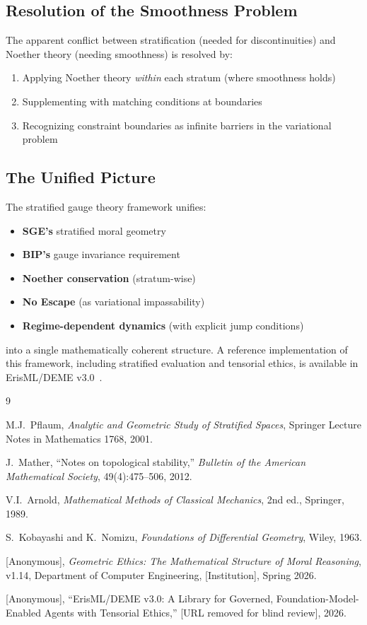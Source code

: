 \documentclass[11pt,a4paper]{article}
\begin{document}
\subsection{Resolution of the Smoothness Problem}

The apparent conflict between stratification (needed for discontinuities) and Noether theory (needing smoothness) is resolved by:
\begin{enumerate}
    \item Applying Noether theory \textit{within} each stratum (where smoothness holds)
    \item Supplementing with matching conditions at boundaries
    \item Recognizing constraint boundaries as infinite barriers in the variational problem
\end{enumerate}

\subsection{The Unified Picture}

The stratified gauge theory framework unifies:
\begin{itemize}
    \item \textbf{SGE's} stratified moral geometry
    \item \textbf{BIP's} gauge invariance requirement
    \item \textbf{Noether conservation} (stratum-wise)
    \item \textbf{No Escape} (as variational impassability)
    \item \textbf{Regime-dependent dynamics} (with explicit jump conditions)
\end{itemize}
into a single mathematically coherent structure. A reference implementation of this framework, including stratified evaluation and tensorial ethics, is available in ErisML/DEME v3.0~\cite{bond2026erisml}.

\begin{thebibliography}{9}

M.J.\ Pflaum, \textit{Analytic and Geometric Study of Stratified Spaces}, Springer Lecture Notes in Mathematics 1768, 2001.

J.\ Mather, ``Notes on topological stability,'' \textit{Bulletin of the American Mathematical Society}, 49(4):475--506, 2012.

V.I.\ Arnold, \textit{Mathematical Methods of Classical Mechanics}, 2nd ed., Springer, 1989.

S.\ Kobayashi and K.\ Nomizu, \textit{Foundations of Differential Geometry}, Wiley, 1963.

[Anonymous], \emph{Geometric Ethics: The Mathematical Structure of Moral Reasoning}, v1.14, Department of Computer Engineering, [Institution], Spring 2026.

[Anonymous], ``ErisML/DEME v3.0: A Library for Governed, Foundation-Model-Enabled Agents with Tensorial Ethics,'' [URL removed for blind review], 2026.

\end{thebibliography}
\end{document}
